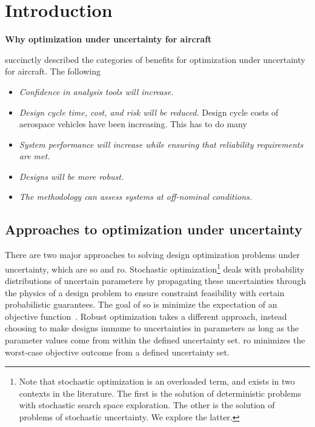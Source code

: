 \section{Introduction}

\textbf{Why optimization under uncertainty for aircraft}


\cite{Zang2002} succinctly described the categories of benefits for optimization under uncertainty for aircraft.
The following
\begin{itemize}
    \item \textit{Confidence in analysis tools will increase.}
    \item \textit{Design cycle time, cost, and risk will be reduced.}
            Design cycle costs of aerospace vehicles have been increasing. This has to do
            many
    \item \textit{System performance will increase while ensuring that reliability requirements
                  are met. }
    \item \textit{Designs will be more robust.}
    \item \textit{The methodology can assess systems at off-nominal conditions.}
\end{itemize}

\subsection{Approaches to optimization under uncertainty}

There are two major approaches to solving design optimization problems under uncertainty,
which are \gls{so} and \gls{ro}. Stochastic optimization\footnote{Note that stochastic
optimization is an overloaded term, and exists in two contexts in the literature. The first is the solution
of deterministic problems with stochastic search space exploration. The other is the solution
of problems of stochastic uncertainty. We explore the latter.}
deals with probability distributions of
uncertain parameters by propagating these uncertainties through the
physics of a design problem to ensure constraint feasibility with certain probabilistic guarantees.
The goal of \gls{so} is minimize the expectation of an objective function~\cite{Diwekar2008}.
Robust optimization takes a different approach, instead choosing to make designs immune to
uncertainties in parameters as long as the parameter values come from within the defined
uncertainty set. \gls{ro} minimizes the worst-case objective outcome from a defined uncertainty set.

